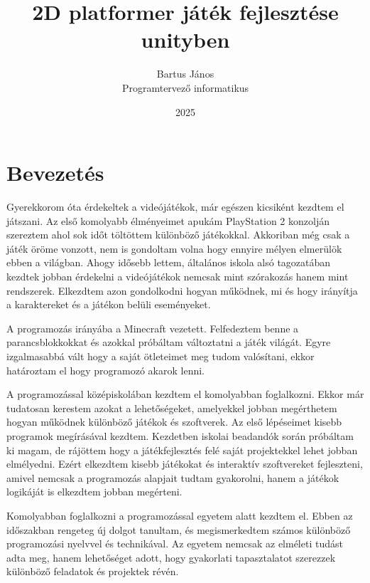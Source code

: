 \documentclass[
]{thesis-ekf}
\theoremstyle{definition}
\theoremstyle{remark}
\begin{document}
\title{2D platformer játék fejlesztése unityben}
\author{Bartus János\\Programtervező informatikus}
\date{2025}
\maketitle

\tableofcontents

\chapter*{Bevezetés}
Gyerekkorom óta érdekeltek a videójátékok, már egészen kicsiként kezdtem el játszani. Az első komolyabb élményeimet apukám PlayStation 2 konzolján szereztem ahol sok időt töltöttem különböző játékokkal. Akkoriban még csak a játék öröme vonzott, nem is gondoltam volna hogy ennyire mélyen elmerülök ebben a világban.
Ahogy idősebb lettem, általános iskola alsó tagozatában kezdtek jobban érdekelni a videójátékok nemcsak mint szórakozás hanem mint rendszerek. Elkezdtem azon gondolkodni hogyan működnek, mi és hogy irányítja a karaktereket és a játékon belüli eseményeket.
 
A programozás irányába a Minecraft vezetett. Felfedeztem benne a parancsblokkokkat és azokkal próbáltam változtatni a játék világát. Egyre izgalmasabbá vált hogy a saját ötleteimet meg tudom valósítani, ekkor határoztam el hogy programozó akarok lenni.

A programozással középiskolában kezdtem el komolyabban foglalkozni. Ekkor már tudatosan kerestem azokat a lehetőségeket, amelyekkel jobban megérthetem hogyan működnek különböző játékok és szoftverek. Az első lépéseimet kisebb programok megírásával kezdtem. Kezdetben iskolai beadandók során próbáltam ki magam, de rájöttem hogy a játékfejlesztés felé saját projektekkel lehet jobban elmélyedni. Ezért elkezdtem kisebb játékokat és interaktív szoftvereket fejleszteni, amivel nemcsak a programozás alapjait tudtam gyakorolni, hanem a játékok logikáját is elkezdtem jobban megérteni.

Komolyabban foglalkozni a programozással egyetem alatt kezdtem el. Ebben az időszakban rengeteg új dolgot tanultam, és megismerkedtem számos különböző programozási nyelvvel és technikával. Az egyetem nemcsak az elméleti tudást adta meg, hanem lehetőséget adott, hogy gyakorlati tapasztalatot szerezzek különböző feladatok és projektek révén.
\end{document}
